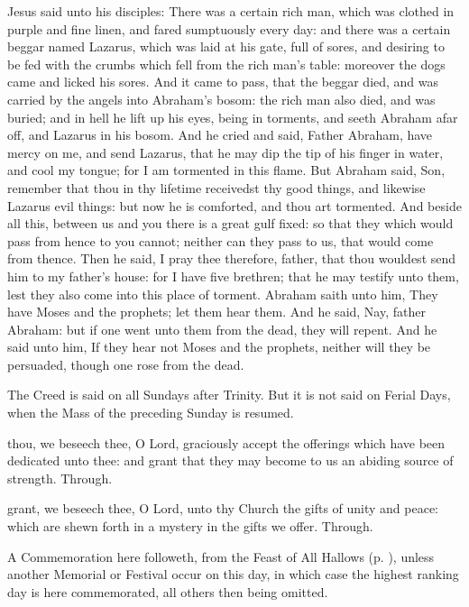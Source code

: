  Jesus said unto his disciples: There was a certain rich man, which was clothed in purple and fine linen, and fared sumptuously every day: and there was a certain beggar named Lazarus, which was laid at his gate, full of sores, and desiring to be fed with the crumbs which fell from the rich man's table: moreover the dogs came and licked his sores. And it came to pass, that the beggar died, and was carried by the angels into Abraham's bosom: the rich man also died, and was buried; and in hell he lift up his eyes, being in torments, and seeth Abraham afar off, and Lazarus in his bosom. And he cried and said, Father Abraham, have mercy on me, and send Lazarus, that he may dip the tip of his finger in water, and cool my tongue; for I am tormented in this flame. But Abraham said, Son, remember that thou in thy lifetime receivedst thy good things, and likewise Lazarus evil things: but now he is comforted, and thou art tormented. And beside all this, between us and you there is a great gulf fixed: so that they which would pass from hence to you cannot; neither can they pass to us, that would come from thence. Then he said, I pray thee therefore, father, that thou wouldest send him to my father's house: for I have five brethren; that he may testify unto them, lest they also come into this place of torment. Abraham saith unto him, They have Moses and the prophets; let them hear them. And he said, Nay, father Abraham: but if one went unto them from the dead, they will repent. And he said unto him, If they hear not Moses and the prophets, neither will they be persuaded, though one rose from the dead.
\begin{rubric}
    The Creed is said on all Sundays after Trinity. But it is not said on Ferial Days, when the Mass of the preceding Sunday is resumed.
\end{rubric}
\secret
{} thou, we beseech thee, O Lord, graciously accept the offerings which have been dedicated unto thee: and grant that they may become to us an abiding source of strength. Through.

 grant, we beseech thee, O Lord, unto thy Church the gifts of unity and peace: which are shewn forth in a mystery in the gifts we offer. Through.

\begin{rubric}
	A Commemoration  here followeth, from the Feast of All Hallows (p. \pageref{AllHallowsCollect}), unless another Memorial or Festival occur on this day, in which case the highest ranking day is here commemorated, all others then being omitted.
\end{rubric}


